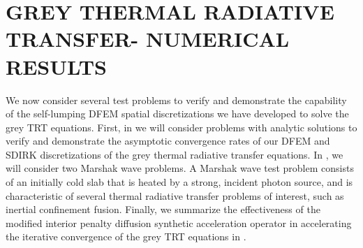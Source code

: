 %
%
%



\chapter{\uppercase{Grey Thermal Radiative Transfer- Numerical Results}}
\label{sec:chapter6_grey_radtran_results}


We now consider several test problems to verify and demonstrate the capability of the self-lumping DFEM spatial discretizations we have developed to solve the grey TRT equations.
First, in  we will consider problems with analytic solutions to verify and demonstrate the asymptotic convergence rates of our DFEM and SDIRK discretizations of the grey thermal radiative transfer equations.
In , we will consider two Marshak wave problems.  
A Marshak wave test problem consists of an initially cold slab that is heated by a strong, incident photon source, and is characteristic of several thermal radiative transfer problems of interest, such as inertial confinement fusion.
Finally, we summarize the effectiveness of the modified interior penalty diffusion synthetic acceleration operator in accelerating the iterative convergence of the grey TRT equations in .

